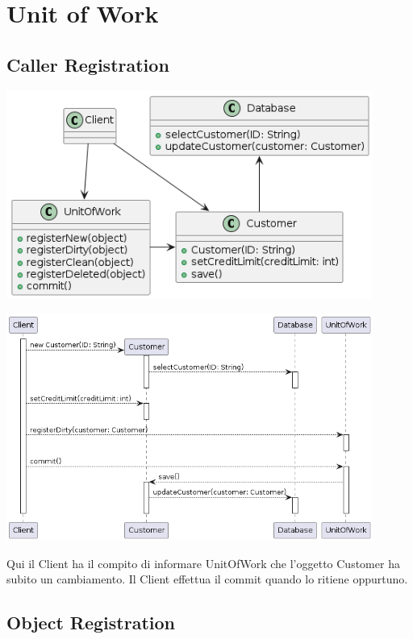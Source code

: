 \chapter{Unit of Work}

\section{Caller Registration}

\begin{center}
    \includegraphics[width=12cm]{images/unit-of-work/CallerRegistrationClass.png}
\end{center}

\begin{center}
    \includegraphics[width=12cm]{images/unit-of-work/CallerRegistrationSD.png}
\end{center}

Qui il Client ha il compito di informare UnitOfWork che l'oggetto Customer ha subito un cambiamento.
Il Client effettua il commit quando lo ritiene oppurtuno.

\section{Object Registration}

